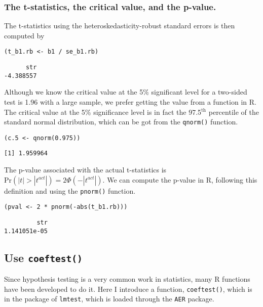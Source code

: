 \documentclass[11pt]{article}
\newcommand{\pr}{\mathrm{Pr}}
\begin{document}
\subsubsection*{The t-statistics, the critical value, and the p-value.}
\label{sec:orgd988d28}

The t-statistics using the heteroskedasticity-robust standard errors
is then computed by
\begin{verbatim}
(t_b1.rb <- b1 / se_b1.rb)
\end{verbatim}

\begin{verbatim}
      str
-4.388557
\end{verbatim}

Although we know the critical value at the 5\% significant level for a
two-sided test is 1.96 with a large sample, we prefer getting the
value from a function in R. The critical value at the 5\% significance
level is in fact the 97.5\(^{\text{th}}\) percentile of the standard normal
distribution, which can be got from the \texttt{qnorm()} function.

\begin{verbatim}
(c.5 <- qnorm(0.975))
\end{verbatim}

\begin{verbatim}
[1] 1.959964
\end{verbatim}

The p-value associated with the actual t-statistics is
\(\pr\left(|t| > |t^{act}| \right) = 2 \Phi(-|t^{act}|)\). We can
compute the p-value in R, following this definition and using the
\texttt{pnorm()} function.

\begin{verbatim}
(pval <- 2 * pnorm(-abs(t_b1.rb)))
\end{verbatim}

\begin{verbatim}
         str
1.141051e-05
\end{verbatim}


\subsection{Use \texttt{coeftest()}}
\label{sec:org2b4f23c}

Since hypothesis testing is a very common work in statistics, many R
functions have been developed to do it. Here I introduce a function,
\texttt{coeftest()}, which is in the package of \texttt{lmtest}, which is loaded
through the \texttt{AER} package.
\end{document}
